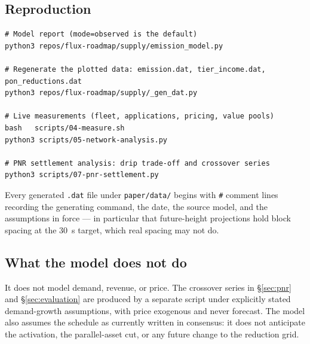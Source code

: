 \subsection{Reproduction}

\begin{lstlisting}[caption={Reproducing every emission figure in this paper.},captionpos=b]
# Model report (mode=observed is the default)
python3 repos/flux-roadmap/supply/emission_model.py

# Regenerate the plotted data: emission.dat, tier_income.dat, pon_reductions.dat
python3 repos/flux-roadmap/supply/_gen_dat.py

# Live measurements (fleet, applications, pricing, value pools)
bash   scripts/04-measure.sh
python3 scripts/05-network-analysis.py

# PNR settlement analysis: drip trade-off and crossover series
python3 scripts/07-pnr-settlement.py
\end{lstlisting}

Every generated \texttt{.dat} file under \texttt{paper/data/} begins with \texttt{\#} comment lines
recording the generating command, the date, the source model, and the assumptions in force --- in
particular that future-height projections hold block spacing at the \SI{30}{\second} target, which
real spacing may not do.

\subsection{What the model does not do}

It does not model demand, revenue, or price. The \PNR crossover series in \S\ref{sec:pnr} and
\S\ref{sec:evaluation} are produced by a separate script under explicitly stated demand-growth
assumptions, with price exogenous and never forecast. The model also assumes the schedule as
currently written in consensus: it does not anticipate the \PNR activation, the parallel-asset cut,
or any future change to the reduction grid.

\FloatBarrier
